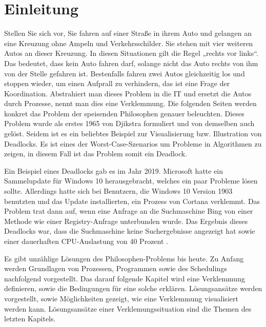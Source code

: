 \chapter{Einleitung}
\label{sec:Einleitung}
Stellen Sie sich vor, Sie fahren auf einer Straße in ihrem Auto und gelangen an eine Kreuzung ohne Ampeln und Verkehrsschilder. Sie stehen mit vier weiteren Autos an dieser Kreuzung. In diesen Situationen gilt die Regel „rechts vor links“. Das bedeutet, dass kein Auto fahren darf, solange nicht das Auto rechts von ihm von der Stelle gefahren ist. Bestenfalls fahren zwei Autos gleichzeitig los und stoppen wieder, um einen Aufprall zu verhindern, das ist eine Frage der Koordination.
Abstrahiert man dieses Problem in die IT und ersetzt die Autos durch Prozesse, nennt man dies eine Verklemmung.
Die folgenden Seiten werden konkret das Problem der speisenden Philosophen genauer beleuchten.
Dieses Problem wurde als erstes 1965 von Djikstra formuliert und von demselben auch gelöst. Seidem ist es ein beliebtes Beispiel zur Visualisierung bzw. Illustration von Deadlocks. Es ist eines der Worst-Case-Szenarios um Probleme in Algorithmen zu zeigen, in diesem Fall ist das Problem somit ein Deadlock.

Ein Beispiel eines Deadlocks gab es im Jahr 2019. Microsoft hatte ein Sammelupdate für Windows 10 herausgebracht, welches ein paar Probleme lösen sollte. Allerdings hatte sich bei Benutzern, die Windows 10 Version 1903 benutzten und das Update installierten, ein Prozess von Cortana verklemmt. Das Problem trat dann auf, wenn eine Anfrage an die Suchmaschine Bing von einer Methode wie einer Registry-Anfrage unterbunden wurde. Das Ergebnis dieses Deadlocks war, dass die Suchmaschine keine Suchergebnisse angezeigt hat sowie einer dauerhaften CPU-Auslastung von 40 Prozent \parencite[vgl.][]{bug}.

Es gibt unzählige Lösungen des Philosophen-Problems bis heute. 
Zu Anfang werden Grundlagen von Prozessen, Programmen sowie des Schedulings nachfolgend vorgestellt. Das darauf folgende Kapitel wird eine Verklemmung definieren, sowie die Bedingungen für eine solche erklären. 
Lösungsansätze werden vorgestellt, sowie Möglichkeiten gezeigt, wie eine Verklemmung visualisiert werden kann. Lösungsansätze einer Verklemungssituation sind die Themen des letzten Kapitels.